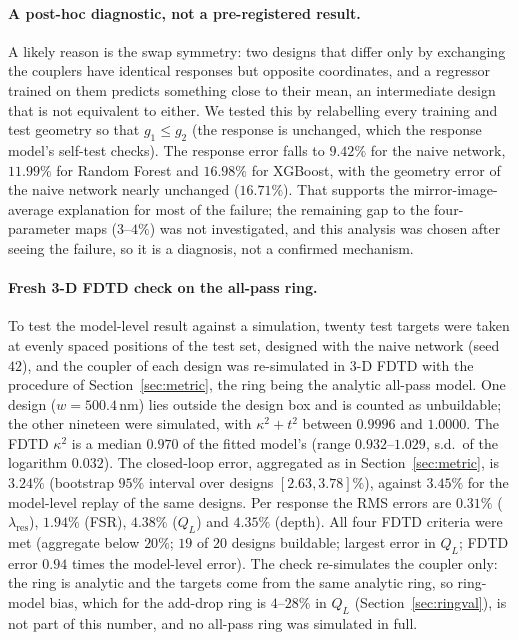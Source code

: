 \documentclass[11pt]{article}
\newcommand{\lres}{\lambda_{\mathrm{res}}}
\newcommand{\QL}{Q_L}
\begin{document}
\paragraph{A post-hoc diagnostic, not a pre-registered result.} A likely reason is the swap symmetry: two designs that differ only by exchanging the couplers have identical responses but opposite coordinates, and a regressor trained on them predicts something close to their mean, an intermediate design that is not equivalent to either. We tested this by relabelling every training and test geometry so that $g_1 \le g_2$ (the response is unchanged, which the response model's self-test checks). The response error falls to $9.42\%$ for the naive network, $11.99\%$ for Random Forest and $16.98\%$ for XGBoost, with the geometry error of the naive network nearly unchanged ($16.71\%$). That supports the mirror-image-average explanation for most of the failure; the remaining gap to the four-parameter maps ($3$--$4\%$) was not investigated, and this analysis was chosen after seeing the failure, so it is a diagnosis, not a confirmed mechanism.

\paragraph{Fresh 3-D FDTD check on the all-pass ring.} To test the model-level result against a simulation, twenty test targets were taken at evenly spaced positions of the test set, designed with the naive network (seed $42$), and the coupler of each design was re-simulated in 3-D FDTD with the procedure of Section~\ref{sec:metric}, the ring being the analytic all-pass model. One design ($w = 500.4$\,nm) lies outside the design box and is counted as unbuildable; the other nineteen were simulated, with $\kappa^2 + t^2$ between $0.9996$ and $1.0000$. The FDTD $\kappa^2$ is a median $0.970$ of the fitted model's (range $0.932$--$1.029$, s.d.\ of the logarithm $0.032$). The closed-loop error, aggregated as in Section~\ref{sec:metric}, is $3.24\%$ (bootstrap $95\%$ interval over designs $[2.63, 3.78]\%$), against $3.45\%$ for the model-level replay of the same designs. Per response the RMS errors are $0.31\%$ ($\lres$), $1.94\%$ (FSR), $4.38\%$ ($\QL$) and $4.35\%$ (depth). All four FDTD criteria were met (aggregate below $20\%$; $19$ of $20$ designs buildable; largest error in $\QL$; FDTD error $0.94$ times the model-level error). The check re-simulates the coupler only: the ring is analytic and the targets come from the same analytic ring, so ring-model bias, which for the add-drop ring is $4$--$28\%$ in $\QL$ (Section~\ref{sec:ringval}), is not part of this number, and no all-pass ring was simulated in full.
\end{document}
